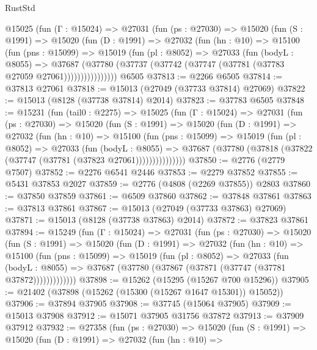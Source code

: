 \begin{lexlean}{RustStd}
\begin{coremodule}
      @15025
        (fun (Γ : @15024) =>
        @27031
          (fun (ps : @27030) =>
          @15020
            (fun (S : @1991) =>
            @15020
              (fun (D : @1991) =>
              @27032
                (fun (hn : @10) =>
                @15100
                  (fun (pns : @15099) =>
                  @15019
                    (fun (pl : @8052) =>
                    @27033
                      (fun (bodyL : @8055) =>
                      @37687
                        (@37780
                          (@37737 (@37742 (@37747 (@37781 (@37783 @27059 @27061))))))))))))))))
    @6505
@37813 := @2266 @6505
@37814 := @37813 @27061
@37818 := @15013 (@27049 (@37733 @37814) @27069)
@37822 := @15013 (@8128 (@37738 @37814) @2014)
@37823 := @37783 @6505
@37848 := @15231
    (fun (tail0 : @2275) =>
    @15025
      (fun (Γ : @15024) =>
      @27031
        (fun (ps : @27030) =>
        @15020
          (fun (S : @1991) =>
          @15020
            (fun (D : @1991) =>
            @27032
              (fun (hn : @10) =>
              @15100
                (fun (pns : @15099) =>
                @15019
                  (fun (pl : @8052) =>
                  @27033
                    (fun (bodyL : @8055) =>
                    @37687 (@37780 (@37818 (@37822 (@37747 (@37781 (@37823 @27061)))))))))))))))
@37850 := @2776 (@2779 @7507)
@37852 := @2276 @6541 @2446
@37853 := @2279 @37852
@37855 := @5431 @37853 @2027
@37859 := @2776 (@4808 (@2269 @37855)) @2803
@37860 := @37850 @37859
@37861 := @6509 @37860
@37862 := @37848 @37861
@37863 := @37813 @37861
@37867 := @15013 (@27049 (@37733 @37863) @27069)
@37871 := @15013 (@8128 (@37738 @37863) @2014)
@37872 := @37823 @37861
@37894 := @15249
    (fun (Γ : @15024) =>
    @27031
      (fun (ps : @27030) =>
      @15020
        (fun (S : @1991) =>
        @15020
          (fun (D : @1991) =>
          @27032
            (fun (hn : @10) =>
            @15100
              (fun (pns : @15099) =>
              @15019
                (fun (pl : @8052) =>
                @27033
                  (fun (bodyL : @8055) =>
                  @37687 (@37780 (@37867 (@37871 (@37747 (@37781 @37872)))))))))))))
@37898 := @15262 (@15295 (@15267 @700 @15296))
@37905 := @21402 (@37898 (@15262 (@15300 (@15267 @1647 @15301)) @15052))
@37906 := @37894 @37905
@37908 := @37745 (@15064 @37905)
@37909 := @15013 @37908
@37912 := @15071 @37905 @31756 @37872
@37913 := @37909 @37912
@37932 := @27358
    (fun (ps : @27030) =>
    @15020
      (fun (S : @1991) =>
      @15020
        (fun (D : @1991) =>
        @27032
          (fun (hn : @10) =>

\end{coremodule}
\end{lexlean}
